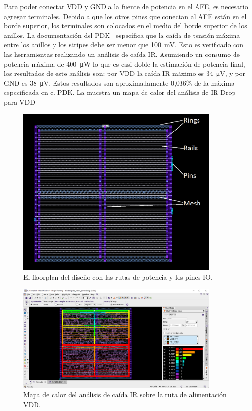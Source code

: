 \documentclass[a4paper, twoside, 11pt]{report}
\begin{document}
Para poder conectar VDD y GND a la fuente de potencia en el AFE, es necesario agregar terminales. Debido a que los otros pines que conectan al AFE están en el borde superior, los terminales son colocados en el medio del borde superior de los anillos. La documentación del PDK~\cite{dig_imp_guidelines} específica que la caída de tensión máxima entre los anillos y los stripes debe ser menor que \SI{100}{\milli\volt}. Esto es verificado con las herramientas realizando un análisis de caída IR. Asumiendo un consumo de potencia máxima de \SI{400}{\micro\watt} lo que es casi doble la estimación de potencia final, los resultados de este análisis son: por VDD la caída IR máximo es \SI{34}{\micro\volt}, y por GND es \SI{38}{\micro\volt}. Estos resultados son aproximadamente 0,036\% de la máxima especificada en el PDK. La  muestra un mapa de calor del análisis de IR Drop para VDD.

\begin{figure}[htb]
  \centering
  \includegraphics[width=0.9\textwidth]{./img/floorplan}
  \caption{El floorplan del diseño con las rutas de potencia y los pines IO.}
  \label{fig:floorplan_pg}
\end{figure}

\begin{figure}[htb]
  \centering
  \includegraphics[width=0.9\textwidth]{./img/dp_create_power_ir_drop}
  \caption{Mapa de calor del análisis de caída IR sobre la ruta de alimentación VDD.}
  \label{fig:ir_drop}
\end{figure}
\end{document}
